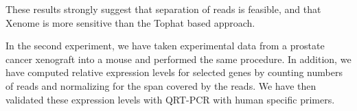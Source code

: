 \documentclass[twocolumn]{article}
\begin{document}
These results strongly suggest that separation of reads is feasible, and that Xenome
is more sensitive than the Tophat based approach.

In the second experiment, we have taken experimental data from a prostate cancer
xenograft into a mouse and performed the same procedure. In addition, we have computed
relative expression levels for selected genes by counting numbers of reads and
normalizing for the span covered by the reads.
We have then validated these expression levels with QRT-PCR with human specific primers.

%

%
%
%
\end{document}

